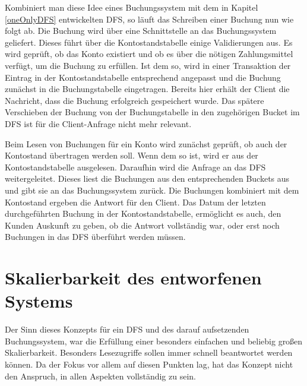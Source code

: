 \documentclass[12pt,oneside,a4paper,parskip]{scrbook}
\begin{document}
Kombiniert man diese Idee eines Buchungssystem mit dem in Kapitel \ref{oneOnlyDFS} entwickelten DFS, so läuft das Schreiben einer Buchung nun wie folgt ab. Die Buchung wird über eine Schnittstelle an das Buchungssystem geliefert. Dieses führt über die Kon\-to\-stands\-ta\-be\-lle einige Validierungen aus. Es wird geprüft, ob das Konto existiert und ob es über die nötigen Zahlungsmittel verfügt, um die Buchung zu erfüllen. Ist dem so, wird in einer Transaktion der Eintrag in der Kontostandstabelle entsprechend angepasst und die Buchung zunächst in die Buchungstabelle eingetragen. Bereits hier erhält der Client die Nachricht, dass die Buchung erfolgreich gespeichert wurde. Das spätere Verschieben der Buchung von der Buchungstabelle in den zugehörigen Bucket im DFS ist für die Client-Anfrage nicht mehr relevant.

Beim Lesen von Buchungen für ein Konto wird zunächst geprüft, ob auch der Kontostand übertragen werden soll. Wenn dem so ist, wird er aus der Kontostandstabelle ausgelesen. Daraufhin wird die Anfrage an das DFS weitergeleitet. Dieses liest die Buchungen aus den entsprechenden Buckets aus und gibt sie an das Buchungssystem zurück. Die Buchungen kombiniert mit dem Kontostand ergeben die Antwort für den Client. Das Datum der letzten durchgeführten Buchung in der Kontostandstabelle, ermöglicht es auch, den Kunden Auskunft zu geben, ob die Antwort vollständig war, oder erst noch Buchungen in das DFS überführt werden müssen.

\section{Skalierbarkeit des entworfenen Systems}
Der Sinn dieses Konzepts für ein DFS und des darauf aufsetzenden Buchungssystem, war die Erfüllung einer besonders einfachen und beliebig großen Skalierbarkeit. Besonders Lesezugriffe sollen immer schnell beantwortet werden können. Da der Fokus vor allem auf diesen Punkten lag, hat das Konzept nicht den Anspruch, in allen Aspekten vollständig zu sein. 
\end{document}
